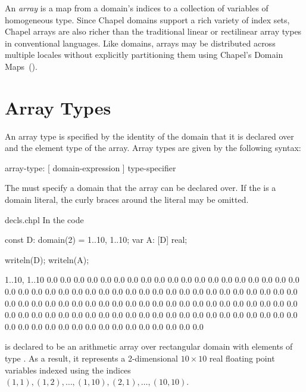 \label{Arrays}

An \emph{array} is a map from a domain's indices to a collection of
variables of homogeneous type.  Since Chapel domains support a rich
variety of index sets, Chapel arrays are also richer than the
traditional linear or rectilinear array types in conventional
languages.  Like domains, arrays may be distributed across multiple
locales without explicitly partitioning them using Chapel's Domain
Maps~().


\section{Array Types}
\label{Array_Types}

An array type is specified by the identity of the domain that it is
declared over and the element type of the array.  Array types are
given by the following syntax:

\begin{syntax}
array-type:
  [ domain-expression ] type-specifier
\end{syntax}
The  must specify a domain that the array can
be declared over.  If the  is a domain
literal, the curly braces around the literal may be omitted.

\begin{chapelexample}{decls.chpl}
In the code
\begin{chapel}
const D: domain(2) = {1..10, 1..10};
var A: [D] real;
\end{chapel}
\begin{chapelpost}
writeln(D);
writeln(A);
\end{chapelpost}
\begin{chapeloutput}
{1..10, 1..10}
0.0 0.0 0.0 0.0 0.0 0.0 0.0 0.0 0.0 0.0
0.0 0.0 0.0 0.0 0.0 0.0 0.0 0.0 0.0 0.0
0.0 0.0 0.0 0.0 0.0 0.0 0.0 0.0 0.0 0.0
0.0 0.0 0.0 0.0 0.0 0.0 0.0 0.0 0.0 0.0
0.0 0.0 0.0 0.0 0.0 0.0 0.0 0.0 0.0 0.0
0.0 0.0 0.0 0.0 0.0 0.0 0.0 0.0 0.0 0.0
0.0 0.0 0.0 0.0 0.0 0.0 0.0 0.0 0.0 0.0
0.0 0.0 0.0 0.0 0.0 0.0 0.0 0.0 0.0 0.0
0.0 0.0 0.0 0.0 0.0 0.0 0.0 0.0 0.0 0.0
0.0 0.0 0.0 0.0 0.0 0.0 0.0 0.0 0.0 0.0
\end{chapeloutput}
 is declared to be an arithmetic array over rectangular
domain  with elements of type .  As a result, it
represents a 2-dimensional $10 \times 10$ real floating point
variables indexed using the indices $(1, 1), (1, 2), \ldots, (1, 10),
(2, 1), \ldots, (10, 10)$.
\end{chapelexample}

